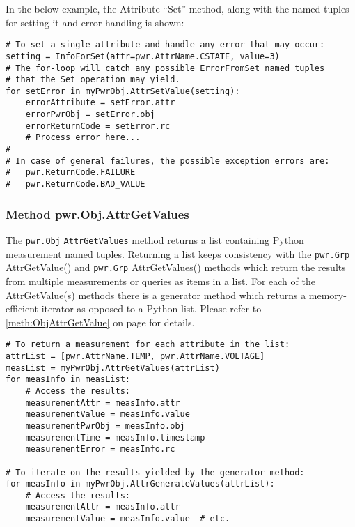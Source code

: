 In the below example, the Attribute ``Set'' method, along with the named tuples for setting it and error handling is shown:

\begin{center}\begin{minipage}{.95\linewidth}\begin{lstlisting}
# To set a single attribute and handle any error that may occur:
setting = InfoForSet(attr=pwr.AttrName.CSTATE, value=3)
# The for-loop will catch any possible ErrorFromSet named tuples
# that the Set operation may yield.
for setError in myPwrObj.AttrSetValue(setting):
    errorAttribute = setError.attr
    errorPwrObj = setError.obj
    errorReturnCode = setError.rc
    # Process error here...
#
# In case of general failures, the possible exception errors are:
#   pwr.ReturnCode.FAILURE
#   pwr.ReturnCode.BAD_VALUE
\end{lstlisting}\end{minipage}\end{center}

\subsubsection{Method pwr.Obj.AttrGetValues}
\label{meth:ObjAttrGetValues}

The \texttt{pwr.Obj} \texttt{AttrGetValues} method returns a list containing Python
measurement named tuples. Returning a list keeps consistency with the
\texttt{pwr.Grp} AttrGetValue() and \texttt{pwr.Grp} AttrGetValues()
methods which return the results from multiple measurements or queries as items
in a list. For each of the AttrGetValue(s) methods there is a generator
method which returns a memory-efficient iterator as opposed to a Python list.
Please refer to \ref{meth:ObjAttrGetValue} on page
\pageref{meth:ObjAttrGetValue} for details.

\begin{center}\begin{minipage}{.95\linewidth}\begin{lstlisting}
# To return a measurement for each attribute in the list:
attrList = [pwr.AttrName.TEMP, pwr.AttrName.VOLTAGE]
measList = myPwrObj.AttrGetValues(attrList)
for measInfo in measList:
    # Access the results:
    measurementAttr = measInfo.attr
    measurementValue = measInfo.value
    measurementPwrObj = measInfo.obj
    measurementTime = measInfo.timestamp
    measurementError = measInfo.rc

# To iterate on the results yielded by the generator method:
for measInfo in myPwrObj.AttrGenerateValues(attrList):
    # Access the results:
    measurementAttr = measInfo.attr
    measurementValue = measInfo.value  # etc.
\end{lstlisting}\end{minipage}\end{center}

